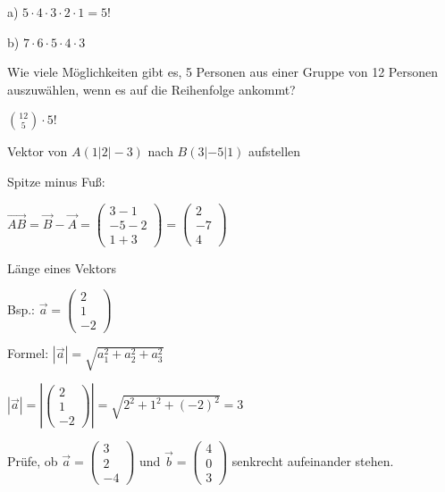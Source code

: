 \documentclass[paper=a6,landscape,ngerman,twoside=true,fontsize=12pt]{scrartcl}
\begin{document}
\begin{antwort}
	\LARGE
	\hspace{1.3cm}	a) $5 \cdot 4 \cdot 3\cdot 2 \cdot 1=5!$
	
	b) $7 \cdot 6 \cdot 5\cdot 4 \cdot 3$
\end{antwort}	
\begin{frage}
	\LARGE
	Wie viele Möglichkeiten gibt es, 5 Personen aus einer Gruppe von 12 Personen auszuwählen, wenn
	es auf die Reihenfolge ankommt?
\end{frage}
\begin{antwort}
	\LARGE
	$\binom{12}{5} \cdot 5!$
\end{antwort}	
\begin{frage}
	Vektor von $A(1|2|-3)$ nach $B(3|-5|1)$ aufstellen
\end{frage}
\begin{antwort}
	Spitze minus Fuß:
	
	\bigskip		
		$\vec{AB}=\vec{B}-\vec{A}=\left(\begin{array}{c} 3-1 \\ -5-2 \\ 1+3\end{array} \right)=\left(\begin{array}{c} 2 \\ -7 \\ 4\end{array} \right)$
		
\end{antwort}		
\begin{frage}
	Länge eines Vektors
	
	Bsp.: $\vec{a}=\left(\begin{array}{c} 2 \\ 1 \\ -2\end{array} \right)$
\end{frage}
\begin{antwort}
	Formel: $\left|\vec{a}\right|=\sqrt{a_1^2 + a_2^2 + a_3^2}$
	
	\bigskip		
$\left|\vec{a}\right|=\left|\left(\begin{array}{c} 2 \\ 1 \\ -2\end{array} \right)\right|=\sqrt{2^2 + 1^2 + (-2)^2}=3$
	
\end{antwort}	
\begin{frage}
	\LARGE
	Prüfe, ob $\vec{a}=\left(\begin{array}{c} 3 \\ 2 \\ -4\end{array} \right)$ und  $\vec{b}=\left(\begin{array}{c} 4 \\ 0 \\ 3\end{array} \right)$ 
	senkrecht aufeinander stehen.
\end{frage}
\end{document}
